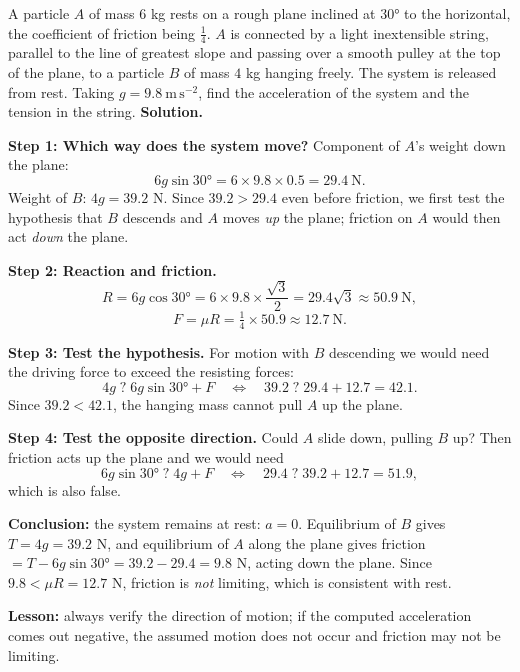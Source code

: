 \documentclass[11pt]{article}
\newcounter{popsec}
\newcounter{popsub}
\newcommand{\courssub}[1]{%
  \stepcounter{popsub}%
  \par\vspace{9pt}\noindent{\popxbold\fontsize{11.5}{13}\selectfont\color{popink}{\color{poporange}\thepopsec.\thepopsub}\hspace{6pt}#1}\par\nopagebreak\vspace{4pt}
}
\begin{document}
\begin{exoresolu}
A particle $A$ of mass $6$ kg rests on a rough plane inclined at $30°$ to the horizontal, the coefficient of friction being $\tfrac{1}{4}$. $A$ is connected by a light inextensible string, parallel to the line of greatest slope and passing over a smooth pulley at the top of the plane, to a particle $B$ of mass $4$ kg hanging freely. The system is released from rest. Taking $g = 9.8\ \mathrm{m\,s^{-2}}$, find the acceleration of the system and the tension in the string.
\tcblower
\textbf{Solution.}

\textbf{Step 1: Which way does the system move?} Component of $A$'s weight down the plane:
\[ 6g\sin 30° = 6 \times 9.8 \times 0.5 = 29.4\ \mathrm{N}. \]
Weight of $B$: $4g = 39.2$ N. Since $39.2 > 29.4$ even before friction, we first test the hypothesis that $B$ descends and $A$ moves \emph{up} the plane; friction on $A$ would then act \emph{down} the plane.

\textbf{Step 2: Reaction and friction.}
\[ R = 6g\cos 30° = 6 \times 9.8 \times \frac{\sqrt{3}}{2} = 29.4\sqrt{3} \approx 50.9\ \mathrm{N}, \]
\[ F = \mu R = \tfrac{1}{4} \times 50.9 \approx 12.7\ \mathrm{N}. \]

\textbf{Step 3: Test the hypothesis.} For motion with $B$ descending we would need the driving force to exceed the resisting forces:
\[ 4g \;?\; 6g\sin 30° + F \quad\Longleftrightarrow\quad 39.2 \;?\; 29.4 + 12.7 = 42.1. \]
Since $39.2 < 42.1$, the hanging mass cannot pull $A$ up the plane.

\textbf{Step 4: Test the opposite direction.} Could $A$ slide down, pulling $B$ up? Then friction acts up the plane and we would need
\[ 6g\sin 30° \;?\; 4g + F \quad\Longleftrightarrow\quad 29.4 \;?\; 39.2 + 12.7 = 51.9, \]
which is also false.

\textbf{Conclusion:} the system remains at rest: $a = 0$. Equilibrium of $B$ gives $T = 4g = 39.2$ N, and equilibrium of $A$ along the plane gives friction $= T - 6g\sin 30° = 39.2 - 29.4 = 9.8$ N, acting down the plane. Since $9.8 < \mu R = 12.7$ N, friction is \emph{not} limiting, which is consistent with rest.

\textbf{Lesson:} always verify the direction of motion; if the computed acceleration comes out negative, the assumed motion does not occur and friction may not be limiting.
\end{exoresolu}

\courssub{Skill 4: Atwood's Machine}
\end{document}
